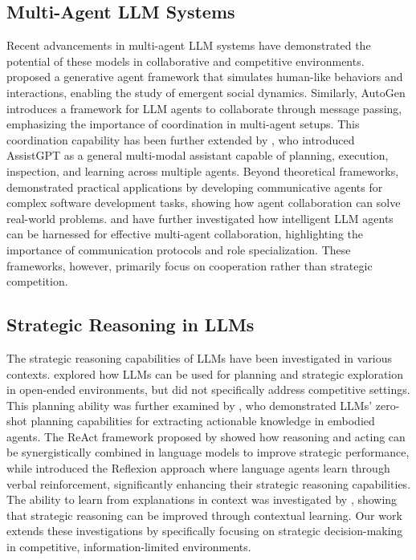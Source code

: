 \documentclass{article}
\begin{document}
\subsection{Multi-Agent LLM Systems}
Recent advancements in multi-agent LLM systems have demonstrated the potential of these models in collaborative and competitive environments. \cite{park2023generative} proposed a generative agent framework that simulates human-like behaviors and interactions, enabling the study of emergent social dynamics. Similarly, AutoGen \cite{wu2023autogen} introduces a framework for LLM agents to collaborate through message passing, emphasizing the importance of coordination in multi-agent setups. This coordination capability has been further extended by \cite{gao2023assistgpt}, who introduced AssistGPT as a general multi-modal assistant capable of planning, execution, inspection, and learning across multiple agents. Beyond theoretical frameworks, \cite{qian2024chatdev} demonstrated practical applications by developing communicative agents for complex software development tasks, showing how agent collaboration can solve real-world problems. \cite{talebirad2023multi} and \cite{talebirad2023multiagentcollaborationharnessingpower} have further investigated how intelligent LLM agents can be harnessed for effective multi-agent collaboration, highlighting the importance of communication protocols and role specialization. These frameworks, however, primarily focus on cooperation rather than strategic competition.

\subsection{Strategic Reasoning in LLMs}
The strategic reasoning capabilities of LLMs have been investigated in various contexts. \cite{wang2023voyager} explored how LLMs can be used for planning and strategic exploration in open-ended environments, but did not specifically address competitive settings. This planning ability was further examined by \cite{huang2022language}, who demonstrated LLMs' zero-shot planning capabilities for extracting actionable knowledge in embodied agents. The ReAct framework proposed by \cite{yao2022react} showed how reasoning and acting can be synergistically combined in language models to improve strategic performance, while \cite{shinn2023reflexion} introduced the Reflexion approach where language agents learn through verbal reinforcement, significantly enhancing their strategic reasoning capabilities. The ability to learn from explanations in context was investigated by \cite{ahn2022can}, showing that strategic reasoning can be improved through contextual learning. Our work extends these investigations by specifically focusing on strategic decision-making in competitive, information-limited environments.
\end{document}

